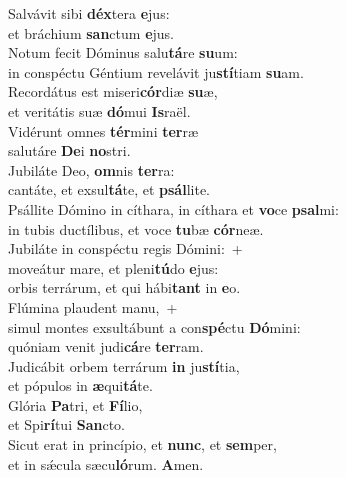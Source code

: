 \evenverse Salvávit sibi \textbf{déx}tera \textbf{e}jus:~\*\\
\evenverse et bráchium \textbf{san}ctum \textbf{e}jus.\\
\oddverse Notum fecit Dóminus salu\textbf{tá}re \textbf{su}um:~\*\\
\oddverse in conspéctu Géntium revelávit ju\textbf{stí}tiam \textbf{su}am.\\
\evenverse Recordátus est miseri\textbf{cór}diæ \textbf{su}æ,~\*\\
\evenverse et veritátis suæ \textbf{dó}mui \textbf{Is}raël.\\
\oddverse Vidérunt omnes \textbf{tér}mini \textbf{ter}ræ~\*\\
\oddverse salutáre \textbf{De}i \textbf{no}stri.\\
\evenverse Jubiláte Deo, \textbf{om}nis \textbf{ter}ra:~\*\\
\evenverse cantáte, et exsul\textbf{tá}te, et \textbf{psál}lite.\\
\oddverse Psállite Dómino in cíthara, in cíthara et \textbf{vo}ce \textbf{psal}mi:~\*\\
\oddverse in tubis ductílibus, et voce \textbf{tu}bæ \textbf{cór}neæ.\\
\evenverse Jubiláte in conspéctu regis Dómini:~+\\
\evenverse  moveátur mare, et pleni\textbf{tú}do \textbf{e}jus:~\*\\
\evenverse orbis terrárum, et qui hábi\textbf{tant} in \textbf{e}o.\\
\oddverse Flúmina plaudent manu,~+\\
\oddverse  simul montes exsultábunt a con\textbf{spé}ctu \textbf{Dó}mini:~\*\\
\oddverse quóniam venit judi\textbf{cá}re \textbf{ter}ram.\\
\evenverse Judicábit orbem terrárum \textbf{in} ju\textbf{stí}tia,~\*\\
\evenverse et pópulos in \textbf{æ}qui\textbf{tá}te.\\
\oddverse Glória \textbf{Pa}tri, et \textbf{Fí}lio,~\*\\
\oddverse et Spi\textbf{rí}tui \textbf{San}cto.\\
\evenverse Sicut erat in princípio, et \textbf{nunc}, et \textbf{sem}per,~\*\\
\evenverse et in sǽcula sæcu\textbf{ló}rum. \textbf{A}men.\\
